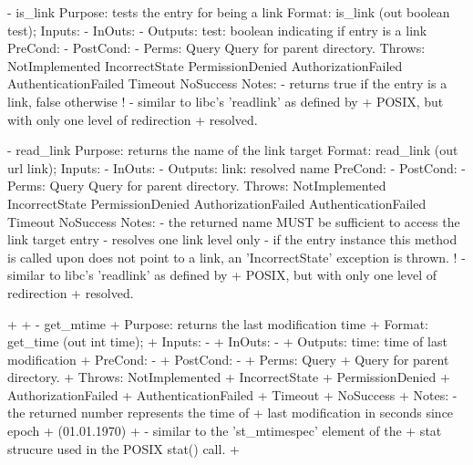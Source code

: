 \begin{myspec}
 
    - is_link
      Purpose:  tests the entry for being a link
      Format:   is_link            (out boolean test);
      Inputs:   -
      InOuts:   -
      Outputs:  test:               boolean indicating if
                                    entry is a link
      PreCond:  -
      PostCond: -
      Perms:    Query
                Query for parent directory.
      Throws:   NotImplemented
                IncorrectState
                PermissionDenied
                AuthorizationFailed
                AuthenticationFailed
                Timeout
                NoSuccess
      Notes:    - returns true if the entry is a link, false
                  otherwise
!               - similar to libc's 'readlink' as defined by
+                 POSIX, but with only one level of redirection
+                 resolved.
 
 
    - read_link 
      Purpose:  returns the name of the link target
      Format:   read_link          (out url       link);
      Inputs:   -
      InOuts:   -
      Outputs:  link:               resolved name
      PreCond:  -
      PostCond: -
      Perms:    Query
                Query for parent directory.
      Throws:   NotImplemented
                IncorrectState
                PermissionDenied
                AuthorizationFailed
                AuthenticationFailed
                Timeout
                NoSuccess
      Notes:    - the returned name MUST be sufficient to
                  access the link target entry
                - resolves one link level only
                - if the entry instance this method is called
                  upon does not point to a link, an
                  'IncorrectState' exception is thrown.
!               - similar to libc's 'readlink' as defined by
+                 POSIX, but with only one level of redirection
+                 resolved.
 
+
+   - get_mtime
+     Purpose:  returns the last modification time
+     Format:   get_time           (out int time);
+     Inputs:   -
+     InOuts:   -
+     Outputs:  time:               time of last modification
+     PreCond:  -
+     PostCond: -
+     Perms:    Query
+               Query for parent directory.
+     Throws:   NotImplemented
+               IncorrectState
+               PermissionDenied
+               AuthorizationFailed
+               AuthenticationFailed
+               Timeout
+               NoSuccess
+     Notes:    - the returned number represents the time of
+                 last modification in seconds since epoch
+                 (01.01.1970)
+               - similar to the 'st_mtimespec' element of the
+                 stat strucure used in the POSIX stat() call.
+
 

\end{myspec}
